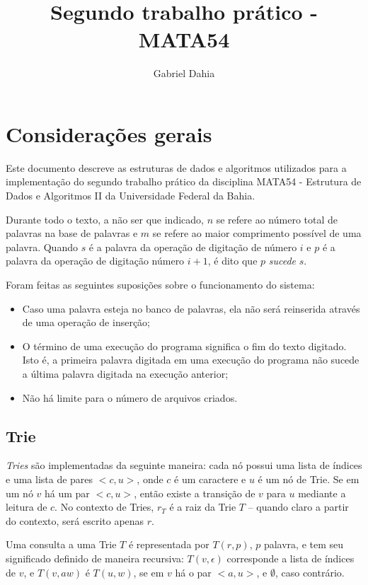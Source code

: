 \documentclass[12pt]{article}
\title{Segundo trabalho prático - MATA54}
\author{Gabriel Dahia}
\begin{document}
  \maketitle

  \section{Considerações gerais}
    Este documento descreve as estruturas de dados e algoritmos utilizados para a implementação do segundo trabalho prático da disciplina MATA54 - Estrutura de Dados e Algoritmos II da Universidade Federal da Bahia.

    Durante todo o texto, a não ser que indicado, $n$ se refere ao número total de palavras na base de palavras e $m$ se refere ao maior comprimento possível de uma palavra.
    Quando $s$ é a palavra da operação de digitação de número $i$ e $p$ é a palavra da operação de digitação número $i + 1$, é dito que $p$ \emph{sucede} $s$.

    Foram feitas as seguintes suposições sobre o funcionamento do sistema:
    \begin{itemize}
      \item Caso uma palavra esteja no banco de palavras, ela não será reinserida através de uma operação de inserção;
      \item O término de uma execução do programa significa o fim do texto digitado.
        Isto é, a primeira palavra digitada em uma execução do programa não sucede a última palavra digitada na execução anterior;
      \item Não há limite para o número de arquivos criados.
    \end{itemize}

    \subsection{Trie}
    \emph{Tries} são implementadas da seguinte maneira: cada nó possui uma lista de índices e uma lista de pares $<c, u>$, onde $c$ é um caractere e $u$ é um nó de Trie.
    Se em um nó $v$ há um par $<c, u>$, então existe a transição de $v$ para $u$ mediante a leitura de $c$. 
    No contexto de Tries, $r_T$ é a raiz da Trie $T$ -- quando claro a partir do contexto, será escrito apenas $r$. 

    Uma consulta a uma Trie $T$ é representada por $T(r, p)$, $p$ palavra, e tem seu significado definido de maneira recursiva: $T(v, \epsilon)$ corresponde a lista de índices de $v$, e $T(v, aw)$ é $T(u, w)$, se em $v$ há o par $<a, u>$, e $\emptyset$, caso contrário.
\end{document}
